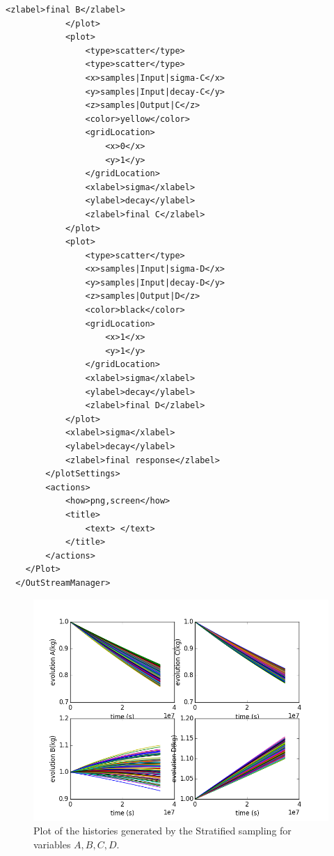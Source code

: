 \begin{enumerate}
\begin{lstlisting}[style=XML,morekeywords={arg,extension,pauseAtEnd,overwrite}]
                <zlabel>final B</zlabel>
            </plot>
            <plot>
                <type>scatter</type>
                <type>scatter</type>
                <x>samples|Input|sigma-C</x>
                <y>samples|Input|decay-C</y>
                <z>samples|Output|C</z>
                <color>yellow</color>
                <gridLocation>
                    <x>0</x>
                    <y>1</y>
                </gridLocation>
                <xlabel>sigma</xlabel>
                <ylabel>decay</ylabel>
                <zlabel>final C</zlabel>
            </plot>
            <plot>
                <type>scatter</type>
                <x>samples|Input|sigma-D</x>
                <y>samples|Input|decay-D</y>
                <z>samples|Output|D</z>
                <color>black</color>
                <gridLocation>
                    <x>1</x>
                    <y>1</y>
                </gridLocation>
                <xlabel>sigma</xlabel>
                <ylabel>decay</ylabel>
                <zlabel>final D</zlabel>
            </plot>
            <xlabel>sigma</xlabel>
            <ylabel>decay</ylabel>
            <zlabel>final response</zlabel>
        </plotSettings>
        <actions>
            <how>png,screen</how>
            <title>
                <text> </text>
            </title>
        </actions>
    </Plot>
  </OutStreamManager>
\end{lstlisting}
 \begin{figure}[h!]
  \centering
  \includegraphics[scale=0.7]{pics/Stratified_histories.png}
  \caption{Plot of the histories generated by the Stratified sampling for variables $A,B,C,D$.}

\end{figure}
\end{enumerate}
